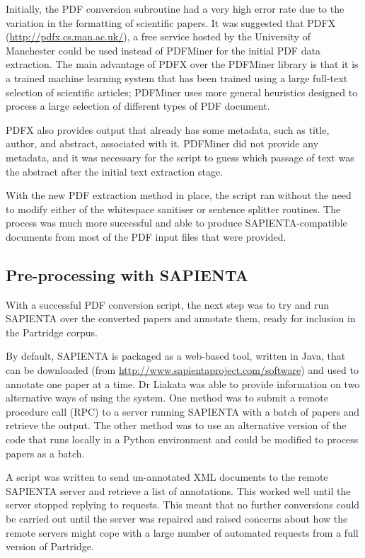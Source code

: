 Initially, the PDF conversion subroutine had a very high error rate due to the
variation in the formatting of scientific papers. It was suggested that PDFX
(\url{http://pdfx.cs.man.ac.uk/}), a free service hosted by the University of
Manchester could be used instead of PDFMiner for the initial PDF data
extraction. The main advantage of PDFX over the PDFMiner library is that it is a
trained machine learning system that has been trained using a large full-text
selection of scientific articles; PDFMiner uses more general heuristics
designed to process a large selection of different types of PDF document.

PDFX also provides output that already has some metadata, such as title,
author, and abstract, associated with it. PDFMiner did not provide any
metadata, and it was necessary for the script to guess which passage of text
was the abstract after the initial text extraction stage.

With the new PDF extraction method in place, the script ran without the need
to modify either of the whitespace sanitiser or sentence splitter routines. The
process was much more successful and able to produce SAPIENTA-compatible
documents from most of the PDF input files that were provided.

\subsection{Pre-processing with SAPIENTA}

With a successful PDF conversion script, the next step was to try and run
SAPIENTA over the converted papers and annotate them, ready for inclusion in
the Partridge corpus.

By default, SAPIENTA is packaged as a web-based tool, written in Java, that
can be downloaded (from \url{http://www.sapientaproject.com/software}) and used
to annotate one paper at a time. Dr Liakata was able to provide information on
two alternative ways of using the system. One method was to submit a remote
procedure call (RPC) to a server running SAPIENTA with a batch of papers and
retrieve the output. The other method was to use an alternative version of the
code that runs locally in a Python environment and could be modified to process
papers as a batch.

A script was written to send un-annotated XML documents to the remote SAPIENTA
server and retrieve a list of annotations. This worked well until the server
stopped replying to requests. This meant that no further conversions could be
carried out until the server was repaired and raised concerns about how the
remote servers might cope with a large number of automated requests from a
full version of Partridge.


